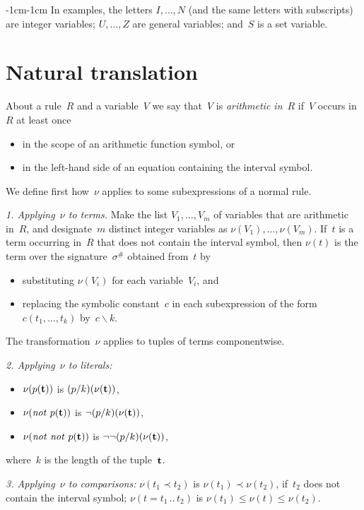 \documentclass[11pt]{article}
\def\bs{\backslash}
\newcommand{\no}{\ensuremath{\mathit{not}}}
\begin{document}
\begin{adjustwidth}{-1cm}{-1cm}
In examples, the letters $I,\dots,N$ (and the same letters with subscripts)
are integer variables; $U,\dots,Z$ are general variables; and~$S$ is a set
variable.

\section{Natural translation}

About a rule~$R$ and a variable~$V$ we say that~$V$ is \emph{arithmetic
  in}~$R$ if~$V$ occurs in~$R$ at least once
\begin{itemize}
\item
  in the scope of an arithmetic function symbol, or
\item
  in the left-hand side of an equation containing the interval symbol.
\end{itemize}

We define first how~$\nu$ applies to some subexpressions of a normal rule.

\medskip\noindent \emph{1. Applying~$\nu$ to terms.}
Make the list $V_1,\dots,V_m$ of variables that are arithmetic in~$R$,
and designate~$m$ distinct integer variables as $\nu(V_1),\dots,\nu(V_m)$.
If~$t$ is a term occurring in~$R$ that does not contain the interval symbol,
then $\nu(t)$ is the term over
the signature~$\sigma^\#$ obtained from~$t$ by
\begin{itemize}
\item substituting $\nu(V_i)$ for each variable~$V_i$, and
\item replacing the symbolic constant~$c$ in each subexpression of the
  form $c(t_1,\dots,t_k)$ by~$c\bs k$.
\end{itemize}

\medskip
The transformation~$\nu$ applies to tuples of terms componentwise.

\medskip\noindent \emph{2. Applying~$\nu$ to literals:}
\begin{itemize}
\item
$\nu(p({\bf t}))$ is $(p/k)(\nu({\bf t}))$,
\item $\nu(\no\ p({\bf t}))$ is $\neg (p/k)(\nu({\bf t}))$,
\item $\nu(\no\ \no\ p({\bf t}))$ is $\neg\neg (p/k)(\nu({\bf t}))$,
\end{itemize}
where~$k$ is the length of the tuple~$\bf t$.

\medskip\noindent \emph{3. Applying~$\nu$ to comparisons: }
$\nu(t_1\prec t_2)$ is $\nu(t_1)\prec\nu(t_2)$, if~$t_2$ does not
contain the interval symbol;
$\nu(t = t_1\,..\,t_2)$ is $\nu(t_1)\leq\nu(t)\leq \nu(t_2)$.


\end{adjustwidth}
\end{document}
